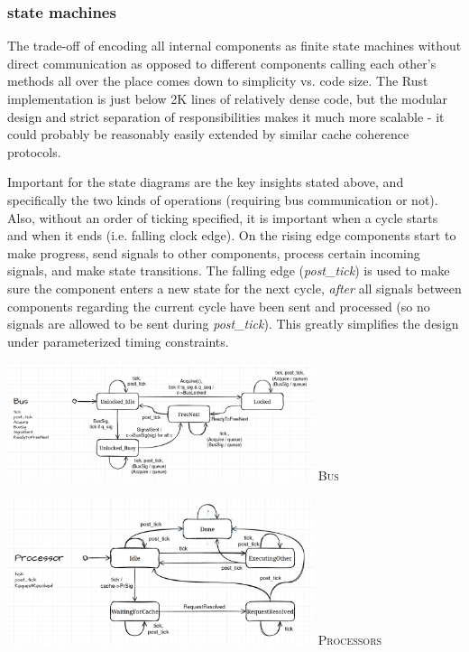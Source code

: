 \documentclass{article}
\begin{document}
\begin{multicols}{2}
\subsubsection{state machines}

The trade-off of encoding all internal components as finite state machines without direct communication as opposed to different components calling each other's methods all over the place comes down to simplicity vs. code size. The Rust implementation is just below 2K lines of relatively dense code, but the modular design and strict separation of responsibilities makes it much more scalable - it could probably be reasonably easily extended by similar cache coherence protocols.

Important for the state diagrams are the key insights stated above, and specifically the two kinds of operations (requiring bus communication or not). Also, without an order of ticking specified, it is important when a cycle starts and when it ends (i.e. falling clock edge). On the rising edge components start to make progress, send signals to other components, process certain incoming signals, and make state transitions. The falling edge (\textit{post\_tick}) is used to make sure the component enters a new state for the next cycle, \textit{after} all signals between components regarding the current cycle have been sent and processed (so no signals are allowed to be sent during \textit{post\_tick}). This greatly simplifies the design under parameterized timing constraints.

\newpage

\begin{center}
\includegraphics[width=9cm]{img/state_diagram_bus.png}
\textsc{Bus}
\end{center}


\begin{center}
\includegraphics[width=9cm]{img/state_diagram_processor.png}
\textsc{Processors}
\end{center}

\end{multicols}
\end{document}
